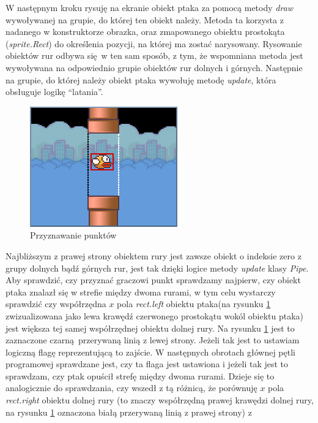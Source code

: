 \documentclass[a4paper,12pt,oneside]{book}
\begin{document}
W następnym kroku rysuję na ekranie obiekt ptaka za pomocą metody \textit{draw}
wywoływanej na grupie, do której ten obiekt należy. Metoda ta korzysta z
nadanego w konstruktorze obrazka, oraz zmapowanego obiektu prostokąta
(\textit{sprite.Rect}) do określenia pozycji, na której ma zostać
narysowany\cite{pygame_group_draw_documentation}. Rysowanie obiektów rur odbywa
się w ten sam sposób, z tym, że wspomniana metoda jest wywoływana na
odpowiednio grupie obiektów rur dolnych i górnych. Następnie na grupie, do
której należy obiekt ptaka wywołuję metodę \textit{update}, która obsługuje
logikę ``latania''.

\begin{figure}
	\begin{center}
		\includegraphics[scale=1.10]{flappy_scoring.png}
		\caption{Przyznawanie punktów}
		\label{flappy_scoring_fig}
	\end{center}
\end{figure}
Najbliższym z prawej strony obiektem rury jest zawsze obiekt o indeksie zero
z grupy dolnych bądź górnych rur, jest tak dzięki logice metody \textit{update}
klasy \textit{Pipe}. Aby sprawdzić, czy przyznać graczowi punkt sprawdzamy
najpierw, czy obiekt ptaka znalazł się w strefie między dwoma rurami, w tym
celu wystarczy sprawdzić czy współrzędna $x$ pola \textit{rect.left} obiektu
ptaka(na rysunku \ref{flappy_scoring_fig} zwizualizowana jako lewa krawędź
czerwonego prostokątu wokól obiektu ptaka) jest większa tej samej współrzędnej
obiektu dolnej rury. Na rysunku \ref{flappy_scoring_fig} jest to zaznaczone
czarną przerywaną linią z lewej strony. Jeżeli tak jest to ustawiam logiczną
flagę reprezentującą to zajście.
W następnych obrotach głównej pętli programowej sprawdzane jest, czy ta flaga
jest ustawiona i jeżeli tak jest to sprawdzam, czy ptak opuścił strefę między
dwoma rurami. Dzieje się to analogicznie do sprawdzania, czy wszedł z tą
różnicą, że porównuję $x$ pola \textit{rect.right} obiektu dolnej rury (to
znaczy współrzędną prawej krawędzi dolnej rury, na rysunku
\ref{flappy_scoring_fig} oznaczona białą przerywaną linią z prawej strony) z
\end{document}
